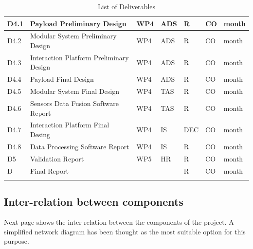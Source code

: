 \begin{longtable}[H]{p{1.8cm} p{2cm} p{1.3cm} p{1.8cm} p{1.3cm} p{2.1cm} p{1.8cm}}
	\midrule

 	D4.1 & Payload Preliminary Design  & WP4 & ADS & R & CO & month  \vspace{0.2cm} \\

 	\midrule

	D4.2 & Modular System Preliminary Design & WP4 & ADS & R & CO & month  \vspace{0.2cm} \\
	
	\midrule
	
	D4.3 & Interaction Platform Preliminary Design  & WP4 & ADS & R & CO & month  \vspace{0.2cm} \\

	\midrule

 	D4.4 & Payload Final Design & WP4 & ADS & R & CO & month  \vspace{0.2cm} \\

 	\midrule

	D4.5 & Modular System  Final Design & WP4 & TAS & R & CO & month  \vspace{0.2cm} \\
	
	\midrule
	
	D4.6 & Sensors Data Fusion Software Report  & WP4 & TAS & R & CO & month  \vspace{0.2cm} \\

	\midrule

 	D4.7 & Interaction Platform Final Desing  & WP4 & IS & DEC & CO & month  \vspace{0.2cm} \\

 	\midrule

	D4.8 & Data Processing Software Report & WP4 & IS & R & CO & month  \vspace{0.2cm} \\
	
	\midrule
	
	D5 & Validation Report & WP5 & HR & R & CO & month  \vspace{0.2cm} \\

	\midrule

 	D & Final Report &  &  & R & CO & month  \vspace{0.2cm} \\
	
	\bottomrule[2pt]
	
	\caption{List of Deliverables}
	\label{Deliverables}
\end{longtable}


\subsection{Inter-relation between components}

Next page shows the inter-relation between the components of the project. A simplified network diagram has been thought as the most suitable option for this purpose. 


